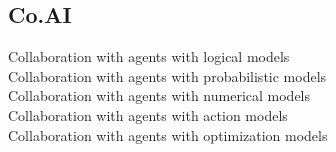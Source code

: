 \subsection{Co.AI}
\begin{description}
\item[Collaboration with agents with logical models]
\item[Collaboration with agents with probabilistic models]
\item[Collaboration with agents with numerical models]
\item[Collaboration with agents with action models]
\item[Collaboration with agents with optimization models]    
\end{description}
